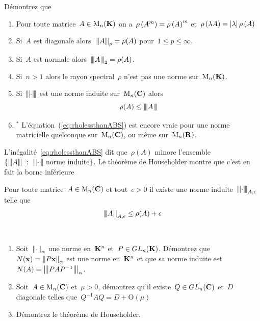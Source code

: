 \begin{exercice}
	Démontrez que %
	\begin{enumerate}
		\item Pour toute matrice~$A\in\M_n(\K)$ on
			a~$\rho\parens{A^m}=\rho\parens{A}^m$ et~$\rho\parens{\lambda
			A}=\abs\lambda\rho\parens{A}$
		\item Si~$A$ est diagonale alors~$\ABS A_p=\rho(A)$
			pour~$1\le p\le\infty$.
		\item Si~$A$ est normale alors~$\ABS A_2=\rho(A)$.
		\item Si~$n>1$ alors le rayon spectral~$\rho$ n'est pas une norme
			sur~$\M_n(\K)$.
		\item Si~$\ABS\cdot$ est une norme induite sur~$\M_n(\C)$ alors
			\begin{equation}\label{eq:rholessthanABS}
				\rho(A)\le\ABS A
			\end{equation}
		\item${}^*$ L'équation~(\ref{eq:rholessthanABS}) est encore vraie pour
			une norme matricielle quelconque sur~$\M_n(\C)$, ou même
			sur~$\M_n(\R)$.
	\end{enumerate}
\end{exercice}


L'inégalité~\ref{eq:rholessthanABS} dit que~$\rho(A)$ minore
l'ensemble~$\left\{\ABS A\ :\ \ABS\cdot\ \textrm{norme induite}\right\}$.  Le
théorème de Householder montre que c'est en fait la borne inférieure

\begin{theorem}[Householder]
	Pour toute matrice~$A\in\M_n(\C)$ et tout~$\epsilon>0$ il existe une norme
	induite~$\ABS\cdot_{A,\epsilon}$ telle que
	\begin{equation}\label{eq:rholessthanABS}
		\ABS A_{A,\epsilon}\le\rho(A)+\epsilon
	\end{equation}
\end{theorem}

\begin{exercice}$ $
	\begin{enumerate}
		\item Soit~$\Abs\cdot_\alpha$ une norme en~$\K^n$ et~$P\in GL_n(\K)$.
			Démontrez que~$N(\x)=\Abs{P\x}_\alpha$ est une norme en~$\K^n$ et que
			sa norme induite est~$N(A)=\ABS{PAP^{-1}}_\alpha$.
		\item Soit~$A\in\M_n(\C)$ et~$\mu>0$, démontrez qu'il existe~$Q\in
			GL_n(\C)$ et~$D$ diagonale telles que~$Q^{-1}AQ=D+\mathrm{O}(\mu)$
		\item Démontrez le théorème de Householder.
	\end{enumerate}
\end{exercice}


